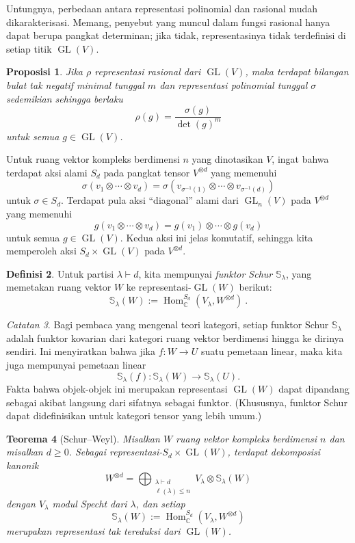 \documentclass[12pt]{article}
\theoremstyle{plain}
\newtheorem{theorem}{Teorema}[section]
\newtheorem{proposition}[theorem]{Proposisi}
\theoremstyle{definition}
\newtheorem{definition}[theorem]{Definisi}
\theoremstyle{remark}
\newtheorem{remark}[theorem]{Catatan}
\numberwithin{equation}{section}
\begin{document}
Untungnya, perbedaan antara representasi polinomial dan rasional
mudah dikarakterisasi. Memang, penyebut yang muncul
dalam fungsi rasional hanya dapat berupa pangkat determinan; jika tidak,
representasinya tidak terdefinisi di setiap titik
$\operatorname{GL}(V)$.

\begin{proposition}
Jika $\rho$ representasi rasional dari $\operatorname{GL}(V)$,
maka terdapat bilangan bulat tak negatif minimal tunggal $m$
dan representasi polinomial tunggal $\sigma$
sedemikian sehingga
berlaku
\[
\rho(g) = \frac{\sigma(g)}{\det(g)^m}
\]
untuk semua $g \in \operatorname{GL}(V)$. 
\end{proposition}

Untuk ruang vektor kompleks berdimensi $n$ yang dinotasikan $V$,
ingat bahwa terdapat aksi alami $S_d$ pada pangkat tensor
$V^{\otimes d}$ yang memenuhi
\[
\sigma(v_1 \otimes \cdots \otimes v_d) =
\sigma(v_{\sigma^{-1}(1)} \otimes \cdots \otimes v_{\sigma^{-1}(d)})
\]
untuk $\sigma \in S_d$.
Terdapat pula aksi ``diagonal'' alami dari $\operatorname{GL}_n(V)$
pada $V^{\otimes d}$ yang memenuhi
\[
g(v_1 \otimes \cdots \otimes v_d) = g(v_1) \otimes \cdots \otimes g(v_d)
\]
untuk semua $g \in \operatorname{GL}(V)$.
Kedua aksi ini jelas komutatif, sehingga kita memperoleh aksi
$S_d \times \operatorname{GL}(V)$ pada $V^{\otimes d}$.

\begin{definition}
Untuk partisi $\lambda \vdash d$, kita
mempunyai \emph{funktor Schur} $\mathbb{S}_\lambda$,
yang memetakan ruang vektor $W$ ke
representasi-$\operatorname{GL}(W)$ berikut:
\[
\mathbb{S}_\lambda(W) :=
\operatorname{Hom}^{S_d}_{\mathbb{C}}(V_\lambda,W^{\otimes d}) \ .
\]
\end{definition}

\begin{remark}
Bagi pembaca yang mengenal teori kategori,
setiap funktor Schur $\mathbb{S}_\lambda$ adalah funktor kovarian
dari kategori ruang vektor berdimensi hingga ke dirinya sendiri.
Ini menyiratkan bahwa jika $f : W \to U$ suatu pemetaan linear,
maka kita juga mempunyai pemetaan linear
\[
\mathbb{S}_\lambda(f) : \mathbb{S}_\lambda(W) \to \mathbb{S}_\lambda(U).
\]
Fakta bahwa objek-objek ini merupakan representasi $\operatorname{GL}(W)$ dapat
dipandang sebagai akibat langsung dari sifatnya sebagai funktor.
(Khususnya, funktor Schur dapat didefinisikan untuk
kategori tensor yang lebih umum.)
\end{remark}

\begin{theorem}[Schur--Weyl]
Misalkan $W$ ruang vektor kompleks berdimensi $n$
dan misalkan $d \ge 0$.
Sebagai representasi-$S_d \times \operatorname{GL}(W)$, terdapat
dekomposisi kanonik
\[
W^{\otimes d} =
\bigoplus_{\substack{\lambda \vdash d\\ \ell(\lambda) \le n}}
V_\lambda \otimes \mathbb{S}_\lambda(W)
\]
dengan $V_\lambda$ modul Specht dari $\lambda$, dan setiap
\[
\mathbb{S}_\lambda(W) :=
\operatorname{Hom}^{S_d}_{\mathbb{C}}(V_\lambda,W^{\otimes d})
\]
merupakan representasi tak tereduksi dari $\operatorname{GL}(W)$.
\end{theorem}
\end{document}
